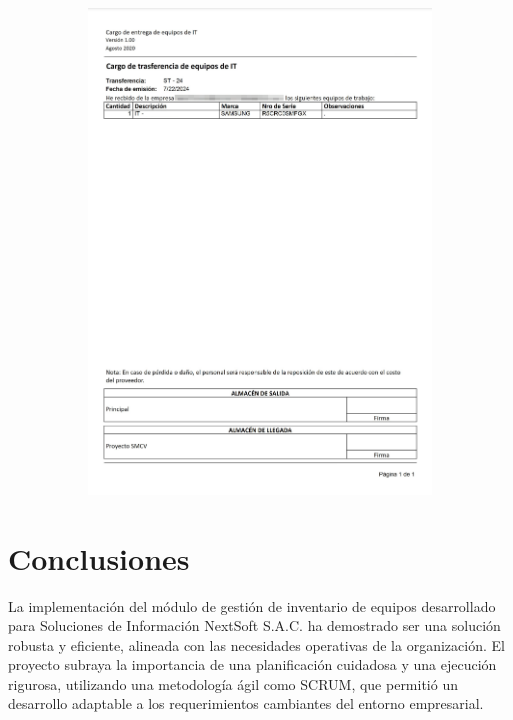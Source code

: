 \documentclass[stu, 12pt, letterpaper, donotrepeattitle, floatsintext, natbib]{apa7}
\begin{document}
\begin{figure}[h]
\begin{subfigure}[b]{0.3\textwidth}
        \includegraphics[width=\textwidth]{./images/reporteTransferencia.png}
    \end{subfigure}
\end{figure}

\newpage
\section{Conclusiones}
La implementación del módulo de gestión de inventario de equipos desarrollado para Soluciones de Información NextSoft S.A.C. ha demostrado ser
una solución robusta y eficiente, alineada con las necesidades operativas de la organización. El proyecto subraya la importancia de una
planificación cuidadosa y una ejecución rigurosa, utilizando una metodología ágil como SCRUM, que permitió un desarrollo adaptable a los
requerimientos cambiantes del entorno empresarial.
\end{document}

